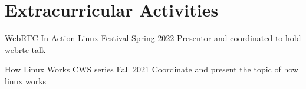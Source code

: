 \section{Extracurricular Activities}

\cventry%
  {WebRTC In Action}
  {Linux Festival}
  {}
  {}
  {Spring 2022}
  {Presentor and coordinated to hold webrtc talk}

\cventry%
  {How Linux Works}
  {CWS series}
  {}
  {}
  {Fall 2021}
  {Coordinate and present the topic of how linux works}

